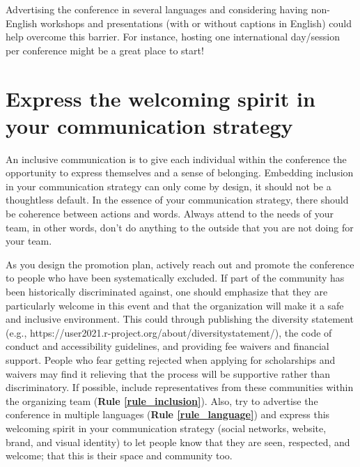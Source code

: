 \documentclass[10pt,letterpaper]{article}
\begin{document}
Advertising the conference in several languages and considering having non-English workshops and presentations (with or without captions in English) could help overcome this barrier. For instance, hosting one international day/session per conference might be a great place to start!



\section{Express the welcoming spirit in your communication strategy}
\label{rule_communication}
An inclusive communication is to give each individual within the conference the opportunity to express themselves and a sense of belonging. Embedding inclusion in your communication strategy can only come by design, it should not be a thoughtless default. In the essence of your communication strategy, there should be coherence between actions and words. Always attend to the needs of your team, in other words, don't do anything to the outside that you are not doing for your team. 

As you design the promotion plan, actively reach out and promote the conference to people who have been systematically excluded. If part of the community has been historically discriminated against, one should emphasize that they are particularly welcome in this event and that the organization will make it a safe and inclusive environment. This could through publishing the diversity statement (e.g., https://user2021.r-project.org/about/diversitystatement/), the code of conduct and accessibility guidelines, and providing fee waivers and financial support. People who fear getting rejected when applying for scholarships and waivers may find it relieving that the process will be supportive rather than discriminatory. If possible, include representatives from these communities within the organizing team (\textbf{Rule \ref{rule_inclusion}}). Also, try to advertise the conference in multiple languages (\textbf{Rule \ref{rule_language}}) and express this welcoming spirit in your communication strategy (social networks, website, brand, and visual identity) to let people know that they are seen, respected, and welcome; that this is their space and community too.
\end{document}
